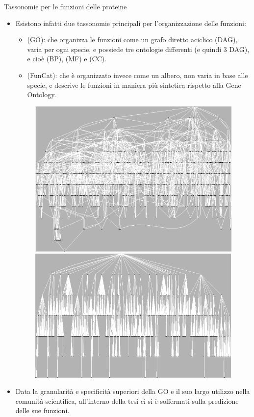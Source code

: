 \documentclass[9pt]{beamer}
\begin{document}
\begin{tframe}{Tassonomie per le funzioni delle proteine}
\begin{itemize}
\item Esistono infatti due tassonomie principali per l'organizzazione delle funzioni:
\begin{itemize}

\item {} (GO):  che organizza le funzioni come un grafo diretto aciclico (DAG), varia per ogni specie, e possiede tre ontologie differenti (e quindi 3 DAG), e cioè  (BP),  (MF) e  (CC). 
\item {} (FunCat): che è organizzato invece come un albero, non varia in base alle specie, e descrive le funzioni in maniera più sintetica rispetto alla Gene Ontology.
\end{itemize}
\begin{figure}[h]
\center
\includegraphics[scale=0.15]{./img/GO.png}
\includegraphics[scale=0.14]{./img/FunCat.png}
\label{DAGTREE}
\end{figure}
\item Data la granularità e specificità superiori della GO e il suo largo utilizzo nella comunità scientifica, all’interno della tesi ci si è soffermati sulla predizione delle sue funzioni.
\end{itemize}  
\end{tframe}
\end{document}
